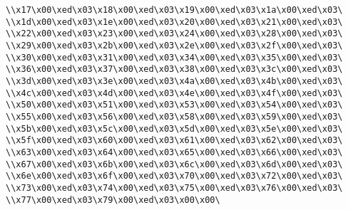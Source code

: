 \verb|\\x17\x00\xed\x03\x18\x00\xed\x03\x19\x00\xed\x03\x1a\x00\xed\x03\|\newline
\verb|\\x1d\x00\xed\x03\x1e\x00\xed\x03\x20\x00\xed\x03\x21\x00\xed\x03\|\newline
\verb|\\x22\x00\xed\x03\x23\x00\xed\x03\x24\x00\xed\x03\x28\x00\xed\x03\|\newline
\verb|\\x29\x00\xed\x03\x2b\x00\xed\x03\x2e\x00\xed\x03\x2f\x00\xed\x03\|\newline
\verb|\\x30\x00\xed\x03\x31\x00\xed\x03\x34\x00\xed\x03\x35\x00\xed\x03\|\newline
\verb|\\x36\x00\xed\x03\x37\x00\xed\x03\x38\x00\xed\x03\x3c\x00\xed\x03\|\newline
\verb|\\x3d\x00\xed\x03\x3e\x00\xed\x03\x4a\x00\xed\x03\x4b\x00\xed\x03\|\newline
\verb|\\x4c\x00\xed\x03\x4d\x00\xed\x03\x4e\x00\xed\x03\x4f\x00\xed\x03\|\newline
\verb|\\x50\x00\xed\x03\x51\x00\xed\x03\x53\x00\xed\x03\x54\x00\xed\x03\|\newline
\verb|\\x55\x00\xed\x03\x56\x00\xed\x03\x58\x00\xed\x03\x59\x00\xed\x03\|\newline
\verb|\\x5b\x00\xed\x03\x5c\x00\xed\x03\x5d\x00\xed\x03\x5e\x00\xed\x03\|\newline
\verb|\\x5f\x00\xed\x03\x60\x00\xed\x03\x61\x00\xed\x03\x62\x00\xed\x03\|\newline
\verb|\\x63\x00\xed\x03\x64\x00\xed\x03\x65\x00\xed\x03\x66\x00\xed\x03\|\newline
\verb|\\x67\x00\xed\x03\x6b\x00\xed\x03\x6c\x00\xed\x03\x6d\x00\xed\x03\|\newline
\verb|\\x6e\x00\xed\x03\x6f\x00\xed\x03\x70\x00\xed\x03\x72\x00\xed\x03\|\newline
\verb|\\x73\x00\xed\x03\x74\x00\xed\x03\x75\x00\xed\x03\x76\x00\xed\x03\|\newline
\verb|\\x77\x00\xed\x03\x79\x00\xed\x03\x00\x00\|\newline
